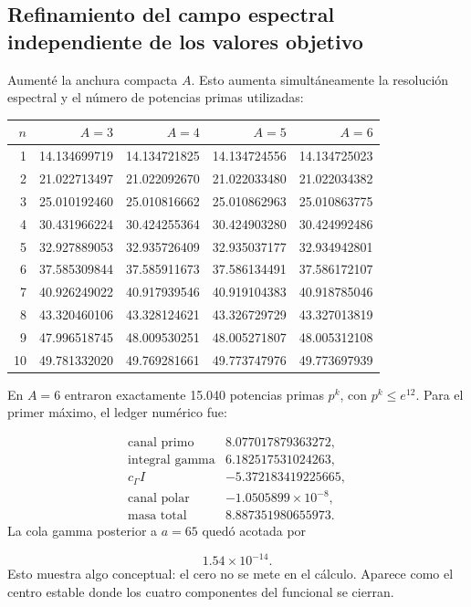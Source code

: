 \subsection{Refinamiento del campo espectral independiente de los valores objetivo}
Aumenté la anchura compacta \(A\). Esto aumenta simultáneamente la resolución espectral y el número de potencias primas utilizadas:\par
{}
\begin{center}
\small
\begin{tabularx}{\textwidth}{@{}RRRRR@{}}
\toprule
\(n\) & \(A=3\) & \(A=4\) & \(A=5\) & \(A=6\) \\
 & 14.134699719 & 14.134721825 & 14.134724556 & 14.134725023 \\
2 & 21.022713497 & 21.022092670 & 21.022033480 & 21.022034382 \\
3 & 25.010192460 & 25.010816662 & 25.010862963 & 25.010863775 \\
4 & 30.431966224 & 30.424255364 & 30.424903280 & 30.424992486 \\
5 & 32.927889053 & 32.935726409 & 32.935037177 & 32.934942801 \\
6 & 37.585309844 & 37.585911673 & 37.586134491 & 37.586172107 \\
7 & 40.926249022 & 40.917939546 & 40.919104383 & 40.918785046 \\
8 & 43.320460106 & 43.328124621 & 43.326729729 & 43.327013819 \\
9 & 47.996518745 & 48.009530251 & 48.005271807 & 48.005312108 \\
10 & 49.781332020 & 49.769281661 & 49.773747976 & 49.773697939 \\
\bottomrule
\end{tabularx}
\end{center}
En \(A=6\) entraron exactamente 15.040 potencias primas \(p^k\), con \(p^k\leq e^{12}\). Para el primer máximo, el ledger numérico fue:\par
\[
\begin{array}{lr}
\text{canal primo} & 8.077017879363272,\\
\text{integral gamma} & 6.182517531024263,\\
c_\Gamma I & -5.372183419225665,\\
\text{canal polar} & -1.0505899\times10^{-8},\\ \hline
\text{masa total} & 8.887351980655973.
\end{array}
\]
La cola gamma posterior a \(a=65\) quedó acotada por\par
\[
1.54\times10^{-14}.
\]
Esto muestra algo conceptual: el cero no se mete en el cálculo. Aparece como el centro estable donde los cuatro componentes del funcional se cierran.\par
{}
